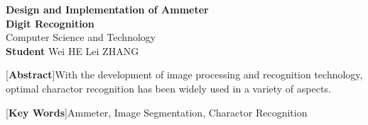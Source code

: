 \begin{center}
\vspace*{12pt}
{\bf{}Design and Implementation of Ammeter\\[10pt] Digit Recognition}\\[18pt]
Computer Science and Technology\\[12pt]
{\bf Student} \quad Wei HE  \quad Lei ZHANG\\[24pt]
\end{center}\par

{[{\bf Abstract}]With the development of image processing and recognition technology, optimal charactor recognition has been widely used in a variety of aspects. }

\vspace{10pt}

[{\bf Key Words}]{Ammeter, Image Segmentation, Charactor Recognition}


